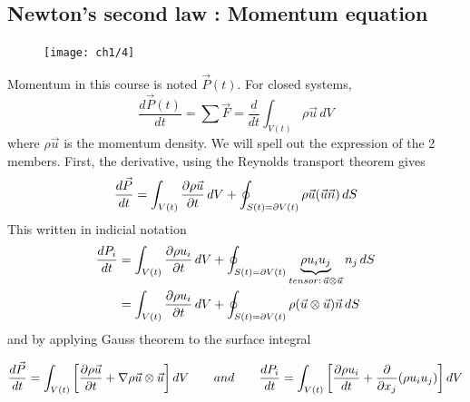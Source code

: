 	\subsection{Newton's second law : Momentum equation}
	\begin{figure}
	\vspace{-5mm}
	\texttt{[image: ch1/4]}
	\label{fig:1.4}
	\end{figure}
	Momentum in this course is noted $\vec{P}(t)$. For closed systems,
	\begin{equation}
		\frac{d\vec{P}(t)}{dt} = \sum \vec{F} = \frac{d}{dt}\int _{V(t)} \rho \vec{u}\, dV
		\label{eq:1.18}
	\end{equation}
	where $\rho \vec{u}$ is the momentum density. We will spell out the expression of the 2 members. First, the derivative, using the Reynolds transport theorem gives 
	\begin{equation}
		\frac{d\vec{P}}{dt} = \int _{V(t)} \frac{\partial \rho \vec{u}}{\partial t}\, dV + \oint _{S(t) = \partial V(t)} \rho \vec{u} (\vec{u} \vec{n}) \, dS
	\end{equation}
	This written in indicial notation
	\begin{equation}
	\begin{aligned}
		\frac{dP_i}{dt} &= \int _{V(t)} \frac{\partial \rho u_i}{\partial t}\, dV + \oint _{S(t) = \partial V(t)} \underbrace{\rho u_i u_j}_{tensor :\, \vec{u} \otimes \vec{u}} n_j \, dS\\
		&= \int _{V(t)} \frac{\partial \rho u_i}{\partial t}\, dV + \oint _{S(t) = \partial V(t)} \rho (\vec{u} \otimes \vec{u}) \vec{n}\, dS 
		\end{aligned}
	\end{equation}
	and by applying Gauss theorem to the surface integral

	\begin{center}
	\begin{equation}
		\frac{d\vec{P}}{dt} = \int _{V(t)} \left[\frac{\partial \rho \vec{u}}{\partial t} + \nabla \rho \vec{u} \otimes \vec{u} \right] dV \qquad and \qquad \frac{dP_i}{dt} = \int _{V(t)} \left[ \frac{\partial \rho u_i}{dt} + \frac{\partial}{\partial x_j} (\rho u_i u_j) \right] dV
	\end{equation}
	\end{center}
	
